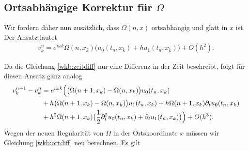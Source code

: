 \subsection*{Ortsabhängige Korrektur für $\Omega$}

Wir fordern daher nun zusätzlich, dass $\Omega(n,x)$ ortsabhängig und glatt in $x$ ist.
Der Ansatz lautet
\begin{align}
v^n_k = e^{i \omega k} \Omega(n, x_k) \bigl( u_0(t_n, x_k) + h u_1(t_n, x_k) \bigr) + O(h^2).
\end{align}

Da die Gleichung \eqref{wkb:zeitdiff} nur eine Differenz in der Zeit beschreibt, folgt für diesen Ansatz ganz analog
\begin{align}
\begin{split}
v^{n+1}_k - v^n_k &= e^{i \omega k} \Bigl( \bigl(\Omega(n+1, x_k) - \Omega(n,x_k) \bigr) u_0(t_n, x_k)\\
&+ h \bigl(\Omega(n+1,x_k) - \Omega(n,x_k) \bigr) u_1(t_n, x_k) + h \Omega(n+1, x_k) \partial_t u_0(t_n, x_k)\\
&+ h^2 \Omega(n+1, x_k) \bigl( \frac{1}{2} \partial^2_t u_0(t_n, x_k) + \partial_t u_1(t_n, x_k) \bigr) \Bigr) + O(h^3).
\end{split}
\end{align}
Wegen der neuen Regularität von $\Omega$ in der Ortskoordinate $x$ müssen wir Gleichung \eqref{wkb:ortdiff} neu berechnen.
Es gilt

